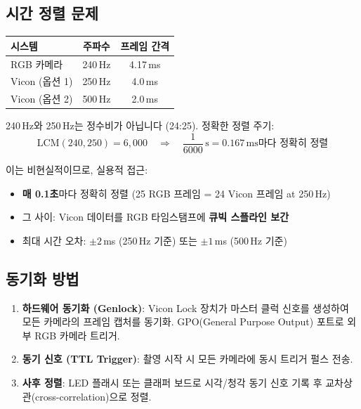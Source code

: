\documentclass[11pt, a4paper]{report}
\begin{document}
\subsection{시간 정렬 문제}

\begin{center}
\renewcommand{\arraystretch}{1.3}
\begin{tabular}{lcc}
\toprule
\textbf{시스템} & \textbf{주파수} & \textbf{프레임 간격} \\
\midrule
RGB 카메라 & 240\,Hz & 4.17\,ms \\
Vicon (옵션 1) & 250\,Hz & 4.0\,ms \\
Vicon (옵션 2) & 500\,Hz & 2.0\,ms \\
\bottomrule
\end{tabular}
\end{center}

240\,Hz와 250\,Hz는 정수비가 아닙니다 (24:25). 정확한 정렬 주기:
\begin{equation}
\text{LCM}(240, 250) = 6{,}000 \quad \Rightarrow \quad \frac{1}{6000}\,\text{s} = 0.167\,\text{ms마다 정확히 정렬}
\end{equation}

이는 비현실적이므로, 실용적 접근:
\begin{itemize}[leftmargin=*]
  \item \textbf{매 0.1초}마다 정확히 정렬 (25 RGB 프레임 = 24 Vicon 프레임 at 250\,Hz)
  \item 그 사이: Vicon 데이터를 RGB 타임스탬프에 \textbf{큐빅 스플라인 보간}
  \item 최대 시간 오차: $\pm 2$\,ms (250\,Hz 기준) 또는 $\pm 1$\,ms (500\,Hz 기준)
\end{itemize}

\subsection{동기화 방법}

\begin{enumerate}[leftmargin=*]
  \item \textbf{하드웨어 동기화 (Genlock)}: Vicon Lock 장치가 마스터 클럭 신호를 생성하여 모든 카메라의 프레임 캡처를 동기화. GPO(General Purpose Output) 포트로 외부 RGB 카메라 트리거.
  \item \textbf{동기 신호 (TTL Trigger)}: 촬영 시작 시 모든 카메라에 동시 트리거 펄스 전송.
  \item \textbf{사후 정렬}: LED 플래시 또는 클래퍼 보드로 시각/청각 동기 신호 기록 후 교차상관(cross-correlation)으로 정렬.
\end{enumerate}
\end{document}
